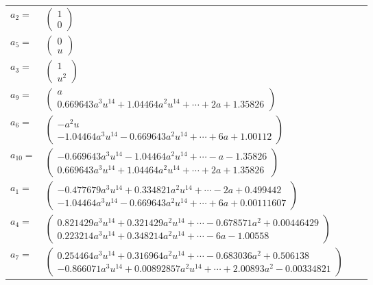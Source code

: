 \documentclass[1p]{elsarticle_modified}
\theoremstyle{definition}
\begin{document}
\begin{tabular}{m{7pt} m{180pt} m{7pt} m{180pt} }
\flushright $a_{2}=$&$\begin{pmatrix}1\\0\end{pmatrix}$ \\
\flushright $a_{5}=$&$\begin{pmatrix}0\\u\end{pmatrix}$ \\
\flushright $a_{3}=$&$\begin{pmatrix}1\\u^2\end{pmatrix}$ \\
\flushright $a_{9}=$&$\begin{pmatrix}a\\0.669643 a^{3} u^{14}+1.04464 a^{2} u^{14}+\cdots+2 a+1.35826\end{pmatrix}$ \\
\flushright $a_{6}=$&$\begin{pmatrix}- a^2 u\\-1.04464 a^{3} u^{14}-0.669643 a^{2} u^{14}+\cdots+6 a+1.00112\end{pmatrix}$ \\
\flushright $a_{10}=$&$\begin{pmatrix}-0.669643 a^{3} u^{14}-1.04464 a^{2} u^{14}+\cdots-a-1.35826\\0.669643 a^{3} u^{14}+1.04464 a^{2} u^{14}+\cdots+2 a+1.35826\end{pmatrix}$ \\
\flushright $a_{1}=$&$\begin{pmatrix}-0.477679 a^{3} u^{14}+0.334821 a^{2} u^{14}+\cdots-2 a+0.499442\\-1.04464 a^{3} u^{14}-0.669643 a^{2} u^{14}+\cdots+6 a+0.00111607\end{pmatrix}$ \\
\flushright $a_{4}=$&$\begin{pmatrix}0.821429 a^{3} u^{14}+0.321429 a^{2} u^{14}+\cdots-0.678571 a^{2}+0.00446429\\0.223214 a^{3} u^{14}+0.348214 a^{2} u^{14}+\cdots-6 a-1.00558\end{pmatrix}$ \\
\flushright $a_{7}=$&$\begin{pmatrix}0.254464 a^{3} u^{14}+0.316964 a^{2} u^{14}+\cdots-0.683036 a^{2}+0.506138\\-0.866071 a^{3} u^{14}+0.00892857 a^{2} u^{14}+\cdots+2.00893 a^{2}-0.00334821\end{pmatrix}$ \\

\end{tabular}
\end{document}
